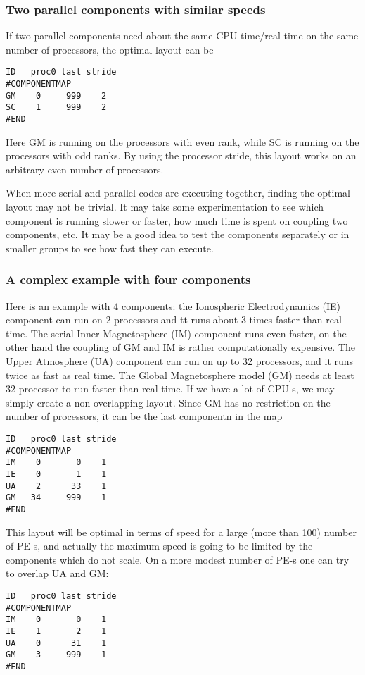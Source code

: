 \subsubsection{Two parallel components with similar speeds}

If two parallel components need about the same CPU time/real time
on the same number of processors, the optimal layout can be
\begin{verbatim}
ID   proc0 last stride
#COMPONENTMAP
GM    0     999    2
SC    1     999    2
#END
\end{verbatim}
Here GM is running on the processors with even rank,
while SC is running on the processors with odd ranks.
By using the processor stride, this layout works on
an arbitrary even number of processors.

When more serial and parallel codes are executing together,
finding the optimal layout may not be trivial. 
It may take some experimentation to see which component
is running slower or faster, how much time is spent
on coupling two components, etc. It may be a good idea
to test the components separately or in smaller groups
to see how fast they can execute.

\subsubsection{A complex example with four components}

Here is an example with 4 components: the Ionospheric
Electrodynamics (IE) component can run on 2 processors and 
tt runs about 3 times faster than real time.
The serial Inner Magnetosphere (IM) component runs even faster,
on the other hand the coupling of GM and IM is rather
computationally expensive. The Upper Atmosphere (UA) component
can run on up to 32 processors, and it runs twice as fast
as real time. The Global Magnetosphere model (GM) needs
at least 32 processor to run faster than real time.
If we have a lot of CPU-s, we may simply create a non-overlapping
layout. Since GM has no restriction on the number of processors,
it can be the last componentn in the map
\begin{verbatim}
ID   proc0 last stride
#COMPONENTMAP
IM    0       0    1
IE    0       1    1
UA    2      33    1
GM   34     999    1
#END
\end{verbatim}
This layout will be optimal in terms of speed for a large 
(more than 100) number of PE-s, and actually the maximum
speed is going to be limited by the components which do
not scale. On a more modest number of PE-s one can try
to overlap UA and GM:
\begin{verbatim}
ID   proc0 last stride
#COMPONENTMAP
IM    0       0    1
IE    1       2    1
UA    0      31    1
GM    3     999    1
#END
\end{verbatim}

